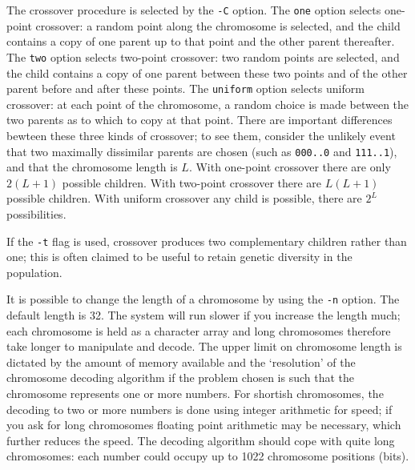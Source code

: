 The crossover procedure is selected by the \verb|-C| option. The
\verb|one| option selects one-point crossover: a random point along
the chromosome is selected, and the child contains a copy
of one parent up to that point and the other parent thereafter.
The \verb|two| option selects two-point crossover: two random
points are selected, and the child contains a copy of one parent
between these two points and of the other parent before and after
these points. The \verb|uniform| option selects uniform crossover:
at each point of the chromosome, a random choice is made between
the two parents as to which to copy at that point. There are
important differences bewteen these three kinds of crossover; to
see them, consider the unlikely event that two maximally dissimilar
parents are chosen (such as \verb|000..0| and \verb|111..1|), and 
that the chromosome length is $L$. With one-point crossover there
are only $2(L+1)$ possible children. With two-point crossover there
are $L(L+1)$ possible children. With uniform crossover any child
is possible, there are $2^L$ possibilities.

If the \verb|-t| flag is used, crossover produces two complementary
children rather than one; this is often claimed to be useful to retain
genetic diversity in the population.

It is possible to change the length of a chromosome by using the
\verb|-n| option. The default length is 32. The system will run slower
if you increase the length much; each chromosome is held as a
character array and long chromosomes therefore take longer to
manipulate and decode. The upper limit on chromosome length is
dictated by the amount of memory available and the `resolution' of the
chromosome decoding algorithm if the problem chosen is such that the
chromosome represents one or more numbers. For shortish chromosomes,
the decoding to two or more numbers is done using integer arithmetic
for speed; if you ask for long chromosomes floating point arithmetic
may be necessary, which further reduces the speed. The decoding
algorithm should cope with quite long chromosomes: each number could
occupy up to 1022 chromosome positions (bits).

